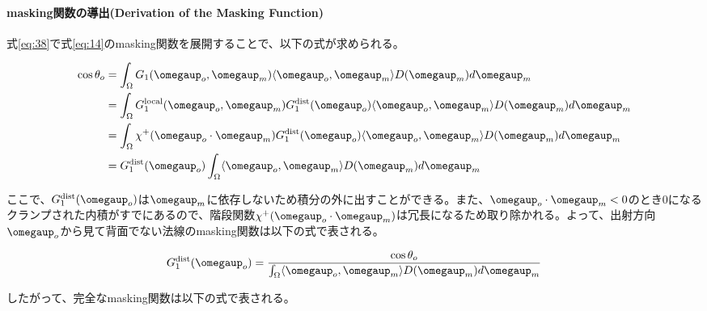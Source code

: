 \documentclass[a4j,xelatex,ja=standard]{bxjsarticle}
\begin{document}
\paragraph{masking関数の導出(Derivation of the Masking Function)}

式\eqref{eq:38}で式\eqref{eq:14}のmasking関数を展開することで、以下の式が求められる。

\begin{equation}
    \begin{split}
        \cos\theta_o
        &= \int_{\Omega} G_1(\boldsymbol{\omegaup}_o, \boldsymbol{\omegaup}_m) \langle \boldsymbol{\omegaup}_o, \boldsymbol{\omegaup}_m \rangle D(\boldsymbol{\omegaup}_m) d\boldsymbol{\omegaup}_m \\
        &= \int_{\Omega} G_1^{\text{local}}(\boldsymbol{\omegaup}_o, \boldsymbol{\omegaup}_m) G_1^{\text{dist}}(\boldsymbol{\omegaup}_o) \langle \boldsymbol{\omegaup}_o, \boldsymbol{\omegaup}_m \rangle D(\boldsymbol{\omegaup}_m) d\boldsymbol{\omegaup}_m \\
        &= \int_{\Omega} \chi^+(\boldsymbol{\omegaup}_o \cdot \boldsymbol{\omegaup}_m) G_1^{\text{dist}}(\boldsymbol{\omegaup}_o) \langle \boldsymbol{\omegaup}_o, \boldsymbol{\omegaup}_m \rangle D(\boldsymbol{\omegaup}_m) d\boldsymbol{\omegaup}_m \\
        &=  G_1^{\text{dist}}(\boldsymbol{\omegaup}_o) \int_{\Omega} \langle \boldsymbol{\omegaup}_o, \boldsymbol{\omegaup}_m \rangle D(\boldsymbol{\omegaup}_m) d\boldsymbol{\omegaup}_m
    \end{split}
    \label{eq:40}
\end{equation}

ここで、$G_1^{\text{dist}}(\boldsymbol{\omegaup}_o)$は$\boldsymbol{\omegaup}_m$に依存しないため積分の外に出すことができる。また、$\boldsymbol{\omegaup}_o \cdot \boldsymbol{\omegaup}_m < 0$のとき$0$になるクランプされた内積がすでにあるので、階段関数$\chi^+(\boldsymbol{\omegaup}_o \cdot \boldsymbol{\omegaup}_m)$は冗長になるため取り除かれる。よって、出射方向$\boldsymbol{\omegaup}_o$から見て背面でない法線のmasking関数は以下の式で表される。

\begin{equation}
    G_1^{\text{dist}}(\boldsymbol{\omegaup}_o) = \frac{\cos\theta_o}{\int_{\Omega} \langle \boldsymbol{\omegaup}_o, \boldsymbol{\omegaup}_m \rangle D(\boldsymbol{\omegaup}_m) d\boldsymbol{\omegaup}_m}
    \label{eq:41}
\end{equation}

したがって、完全なmasking関数は以下の式で表される。
\end{document}

